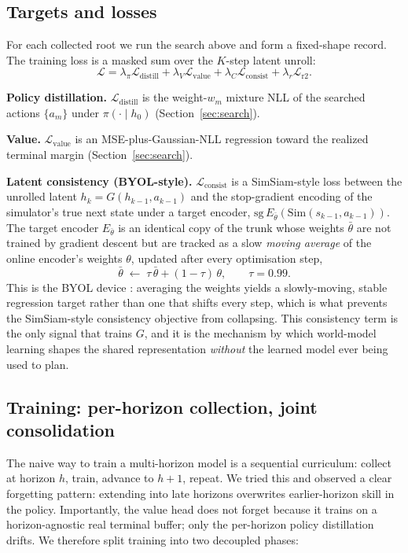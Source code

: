 \documentclass[11pt]{article}
\begin{document}
\subsection{Targets and losses}
\label{sec:targets}
For each collected root we run the search above and form a fixed-shape
record. The training loss is a masked sum over the $K$-step latent unroll:
\begin{equation}
\mathcal{L} = \lambda_{\pi}\mathcal{L}_{\text{distill}}
            + \lambda_{V}\mathcal{L}_{\text{value}}
            + \lambda_{C}\mathcal{L}_{\text{consist}}
            + \lambda_{r}\mathcal{L}_{\text{r2}} .
\label{eq:loss}
\end{equation}

\textbf{Policy distillation.} $\mathcal{L}_{\text{distill}}$ is the
weight-$w_m$ mixture NLL of the searched actions $\{a_m\}$ under
$\pi(\cdot\mid h_0)$ (Section~\ref{sec:search}).

\textbf{Value.} $\mathcal{L}_{\text{value}}$ is an MSE-plus-Gaussian-NLL
regression toward the realized terminal margin (Section~\ref{sec:search}).

\textbf{Latent consistency (BYOL-style).}
$\mathcal{L}_{\text{consist}}$ is a SimSiam-style loss between the unrolled
latent $h_{k}=G(h_{k-1},a_{k-1})$ and the stop-gradient encoding of the
simulator's true next state under a target encoder,
$\mathrm{sg}\,E_{\bar\theta}(\mathrm{Sim}(s_{k-1},a_{k-1}))$. The target
encoder $E_{\bar\theta}$ is an identical copy of the trunk whose weights
$\bar\theta$ are not trained by gradient descent but are tracked as a slow
\emph{moving average} of the online encoder's weights $\theta$, updated
after every optimisation step,
\begin{equation}
\bar\theta \;\leftarrow\; \tau\,\bar\theta + (1-\tau)\,\theta,
\qquad \tau = 0.99 .
\label{eq:ema}
\end{equation}
This is the BYOL device \cite{grill2020bootstrap}: averaging the weights
yields a slowly-moving, stable regression target rather than one that shifts
every step, which is what prevents the SimSiam-style consistency objective
from collapsing. This consistency term is the only signal that trains $G$,
and it is the mechanism by which world-model learning shapes the shared
representation \emph{without} the learned model ever being used to plan.


\subsection{Training: per-horizon collection, joint consolidation}
\label{sec:phases}
The naive way to train a multi-horizon model is a sequential curriculum:
collect at horizon $h$, train, advance to $h{+}1$, repeat. We tried this and
observed a clear forgetting pattern: extending into late horizons overwrites
earlier-horizon skill in the policy. Importantly, the value head does not
forget because it trains on a horizon-agnostic real terminal buffer; only
the per-horizon policy distillation drifts. We therefore split training
into two decoupled phases:
\end{document}
